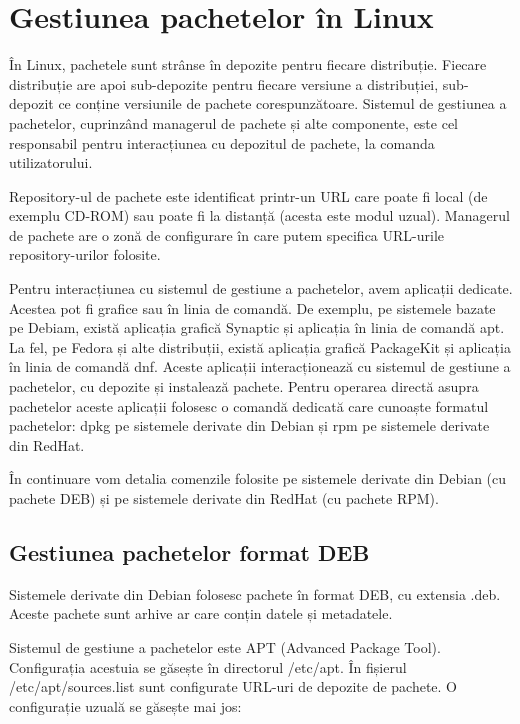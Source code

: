 \section{Gestiunea pachetelor în Linux}
\label{sec:package:linux}

În Linux, pachetele sunt strânse în depozite pentru fiecare distribuție. Fiecare distribuție are apoi sub-depozite pentru fiecare versiune a distribuției, sub-depozit ce conține versiunile de pachete corespunzătoare. Sistemul de gestiunea a pachetelor, cuprinzând managerul de pachete și alte componente, este cel responsabil pentru interacțiunea cu depozitul de pachete, la comanda utilizatorului.

Repository-ul de pachete este identificat printr-un URL care poate fi local (de exemplu CD-ROM) sau poate fi la distanță (acesta este modul uzual). Managerul de pachete are o zonă de configurare în care putem specifica URL-urile repository-urilor folosite.

Pentru interacțiunea cu sistemul de gestiune a pachetelor, avem aplicații dedicate. Acestea pot fi grafice sau în linia de comandă. De exemplu, pe sistemele bazate pe Debiam, există aplicația grafică Synaptic și aplicația în linia de comandă apt. La fel, pe Fedora și alte distribuții, există aplicația grafică PackageKit și aplicația în linia de comandă dnf. Aceste aplicații interacționează cu sistemul de gestiune a pachetelor, cu depozite și instalează pachete. Pentru operarea directă asupra pachetelor aceste aplicații folosesc o comandă dedicată care cunoaște formatul pachetelor: dpkg pe sistemele derivate din Debian și rpm pe sistemele derivate din RedHat.

În continuare vom detalia comenzile folosite pe sistemele derivate din Debian (cu pachete DEB) și pe sistemele derivate din RedHat (cu pachete RPM).

\subsection{Gestiunea pachetelor format DEB}
\label{sec:package:deb}

Sistemele derivate din Debian folosesc pachete în format DEB, cu extensia .deb. Aceste pachete sunt arhive ar care conțin datele și metadatele.

Sistemul de gestiune a pachetelor este APT (Advanced Package Tool). Configurația acestuia se găsește în directorul /etc/apt. În fișierul /etc/apt/sources.list sunt configurate URL-uri de depozite de pachete. O configurație uzuală se găsește mai jos:

